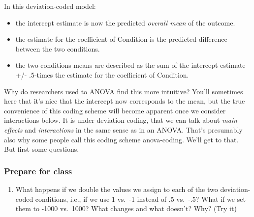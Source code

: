 \documentclass[
]{article}
\newenvironment{Shaded}{\begin{snugshade}}{\end{snugshade}}
\newcommand{\DecValTok}[1]{\textcolor[rgb]{0.00,0.00,0.81}{#1}}
\newcommand{\KeywordTok}[1]{\textcolor[rgb]{0.13,0.29,0.53}{\textbf{#1}}}
\newcommand{\NormalTok}[1]{#1}
\newcommand{\OperatorTok}[1]{\textcolor[rgb]{0.81,0.36,0.00}{\textbf{#1}}}
\newcommand{\StringTok}[1]{\textcolor[rgb]{0.31,0.60,0.02}{#1}}
\providecommand{\tightlist}{%
  \setlength{\itemsep}{0pt}\setlength{\parskip}{0pt}}
\begin{document}
\normalsize

In this deviation-coded model:

\begin{itemize}
\tightlist
\item
  the intercept estimate is now the predicted \emph{overall mean} of the
  outcome.
\item
  the estimate for the coefficient of Condition is the predicted
  difference between the two conditions.
\item
  the two conditions means are described as the sum of the intercept
  estimate +/- .5-times the estimate for the coefficient of Condition.
\end{itemize}

Why do researchers used to ANOVA find this more intuitive? You'll
sometimes here that it's nice that the intercept now corresponds to the
mean, but the true convenience of this coding scheme will become
apparent once we consider interactions below. It is under
deviation-coding, that we can talk about \emph{main effects} and
\emph{interactions} in the same sense as in an ANOVA. That's presumably
also why some people call this coding scheme anova-coding. We'll get to
that. But first some questions.

\hypertarget{prepare-for-class-1}{%
\subsubsection{Prepare for class}\label{prepare-for-class-1}}

\begin{enumerate}
\def\labelenumi{\arabic{enumi}.}
\tightlist
\item
  What happens if we double the values we assign to each of the two
  deviation-coded conditions, i.e., if we use 1 vs.~-1 instead of .5
  vs.~-.5? What if we set them to -1000 vs.~1000? What changes and what
  doesn't? Why? (Try it)
\end{enumerate}

\footnotesize

\begin{Shaded}
\end{Shaded}
\end{document}
